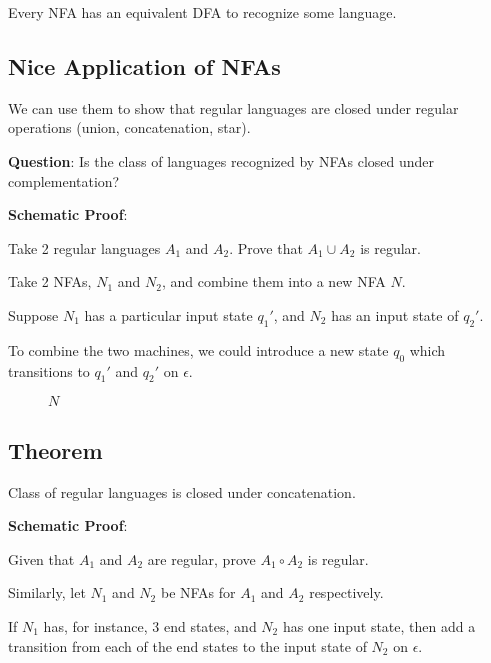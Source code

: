 \documentclass{article}
\begin{document}
Every NFA has an equivalent DFA to recognize some language.

\subsection*{Nice Application of NFAs}

We can use them to show that regular languages are closed under
regular operations (union, concatenation, star).

\textbf{Question}: Is the class of languages recognized by NFAs closed
under complementation?

\textbf{Schematic Proof}:

Take 2 regular languages $A_1$ and $A_2$. Prove that $A_1\cup{}A_2$ is
regular.

Take 2 NFAs, $N_1$ and $N_2$, and combine them into a new NFA $N$.

Suppose $N_1$ has a particular input state $q_1'$, and $N_2$ has an
input state of $q_2'$.

To combine the two machines, we could introduce a new state $q_0$
which transitions to $q_1'$ and $q_2'$ on $\epsilon$.

\begin{figure}[H]
  \centering
  \caption{$N$}
\end{figure}

\subsection*{Theorem}

Class of regular languages is closed under concatenation.

\textbf{Schematic Proof}:

Given that $A_1$ and $A_2$ are regular, prove $A_1\circ{}A_2$ is
regular.

Similarly, let $N_1$ and $N_2$ be NFAs for $A_1$ and $A_2$
respectively.

If $N_1$ has, for instance, 3 end states, and $N_2$ has one input
state, then add a transition from each of the end states to the input
state of $N_2$ on $\epsilon$.
\end{document}
